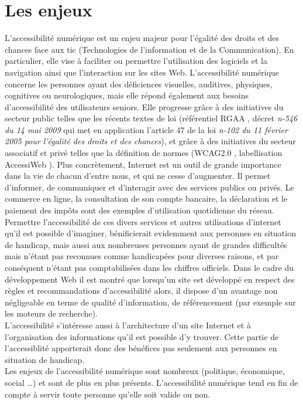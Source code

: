 \documentclass[french,a4paper]{report}
\begin{document}
\section{Les enjeux}
L'accessibilité numérique est un enjeu majeur pour l’égalité des droits et des chances face aux
\gls{tic} (Technologies de l'information et de la Communication). En particulier, elle vise
à faciliter ou permettre l’utilisation des logiciels et la
navigation ainsi que l’interaction sur les sites Web. L’accessibilité numérique concerne les
personnes ayant des déficiences visuelles, auditives, physiques, cognitives ou neurologiques,
mais elle répond également aux besoins d’accessibilité des utilisateurs seniors.
Elle progresse grâce à des initiatives du secteur public telles que les
récents textes de loi (référentiel RGAA \cite{RGAA}, décret \emph{n-546 du 14 mai 2009}
qui met en application l'article 47 de la loi \emph{n-102 du 11 février 2005 pour
l'égalité des droits et des chances}), et grâce à des initiatives du secteur associatif et privé telles
que la définition de normes (WCAG2.0 \cite{WCAG2}, labellisation AccessiWeb \cite{AccessiWeb}).
\newline
Plus concrètement, Internet est un outil de grande importance dans la vie de chacun d’entre nous,
et qui ne cesse d’augmenter. Il permet d’informer, de communiquer et d’interagir avec des
services publics ou privés. Le commerce en ligne, la consultation de son compte bancaire, la
déclaration et le paiement des impôts sont des exemples d’utilisation quotidienne du réseau.
Permettre l'accessibilité de ces divers services et autres utilisations d'internet qu'il est
possible d'imaginer, bénificierait evidemment aux personnes en situation de handicap, mais aussi
aux nombreuses personnes ayant de grandes difficultés mais n'étant pas reconnues comme handicapées
pour diverses raisons,
et par conséquent n'étant pas comptabilisées dans les chiffres officiels.
Dans le cadre du développement Web il est montré que lorsqu'un site est développé en respect
des règles et recommandations d'accessibilité alors, il dispose d'un avantage non négligeable en
terme de qualité d'information, de référencement (par exemple sur les moteurs de recherche).\\
L'accessibilité s'intéresse aussi à l'architecture d'un site Internet et à
l'organisation des informations qu'il est possible d'y trouver. Cette partie de
l'accessiblité apporterait donc des bénéfices pas seulement aux personnes en situation de handicap. \\
Les enjeux de l'accessibilité numérique sont nombreux (politique, économique,
social \dots) et sont de plus en plus présents. L'accessibilité numérique tend
en fin de compte à servir toute personne qu'elle soit valide ou non.
\end{document}
